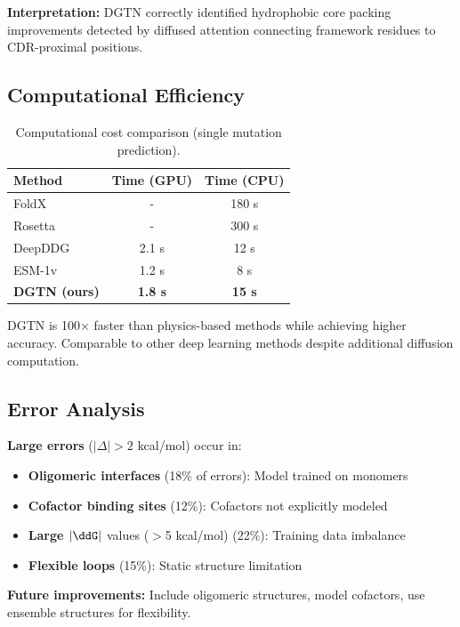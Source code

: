 \documentclass[12pt,en]{elegantpaper}
\begin{document}
\textbf{Interpretation:} DGTN correctly identified hydrophobic core packing improvements detected by diffused attention connecting framework residues to CDR-proximal positions.

\subsection{Computational Efficiency}

\begin{table}[t]
\centering
\caption{Computational cost comparison (single mutation prediction).}
\label{tab:efficiency}
\begin{tabular}{lcc}
\toprule
\textbf{Method} & \textbf{Time (GPU)} & \textbf{Time (CPU)} \\
\midrule
FoldX & - & 180 s \\
Rosetta & - & 300 s \\
DeepDDG & 2.1 s & 12 s \\
ESM-1v & 1.2 s & 8 s \\
\textbf{DGTN (ours)} & \textbf{1.8 s} & \textbf{15 s} \\
\bottomrule
\end{tabular}
\end{table}

DGTN is 100× faster than physics-based methods while achieving higher accuracy. Comparable to other deep learning methods despite additional diffusion computation.

\subsection{Error Analysis}

\textbf{Large errors} ($|\Delta| > 2$ kcal/mol) occur in:
\begin{itemize}
    \item \textbf{Oligomeric interfaces} (18\% of errors): Model trained on monomers
    \item \textbf{Cofactor binding sites} (12\%): Cofactors not explicitly modeled
    \item \textbf{Large $|\ddG|$} values ($>$5 kcal/mol) (22\%): Training data imbalance
    \item \textbf{Flexible loops} (15\%): Static structure limitation
\end{itemize}

\textbf{Future improvements:} Include oligomeric structures, model cofactors, use ensemble structures for flexibility.
\end{document}
